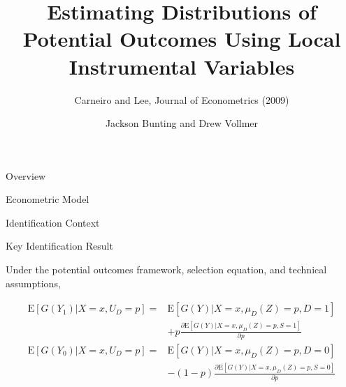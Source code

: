 \documentclass{beamer}
\newcommand{\E}{\mathrm{E}} %
\begin{document}
\title[Distributions of Potential Outcomes]{Estimating Distributions
  of Potential Outcomes Using Local Instrumental Variables}
\subtitle{Carneiro and Lee, Journal of Econometrics (2009)}
\author[]{Jackson Bunting and Drew Vollmer}
\frame{\maketitle}


\begin{frame}{Overview}


\end{frame}


\begin{frame}{Econometric Model} %



\end{frame}


\begin{frame}{Identification Context}
\end{frame}


\begin{frame}[shrink = 1]{Key Identification Result}

\begin{theorem}
  Under the potential outcomes framework, selection equation, and
  technical assumptions,

\vspace{-.25cm}
\begin{align*}
  \E\left[ G(Y_1) | X = x, U_D = p \right] = &\E \left[ G(Y) | X = x, \mu_D(Z) = p, D = 1 \right] \\
  &+ p \frac{\partial \E\left[ G(Y) | X = x, \mu_D(Z) = p, S = 1 \right]}{\partial p} \\
  \E\left[ G(Y_0) | X = x, U_D = p \right] = &\E \left[ G(Y) | X = x, \mu_D(Z) = p, D = 0 \right] \\
  &- (1 - p) \frac{\partial \E\left[ G(Y) | X = x, \mu_D(Z) = p, S = 0 \right]}{\partial p} \\
\end{align*}
\end{theorem}

\end{frame}
\end{document}
